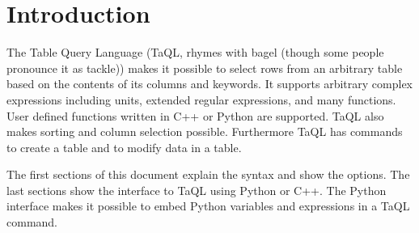 

\section{Introduction}
The Table Query Language (TaQL, rhymes with bagel (though some people
pronounce it as tackle)) makes it possible to select
rows from an arbitrary table based on the contents of its
columns and keywords. It supports arbitrary complex
expressions including units, extended regular expressions, and many
functions. User defined functions written in C++ or Python are supported.
TaQL also makes sorting and column selection possible.
Furthermore TaQL has commands to create a table and to modify data
in a table.

The first sections of this document explain the syntax and show the options.
The last sections show the interface to TaQL using Python or C++.
The Python interface makes it possible to embed Python
variables and expressions in a TaQL command.

